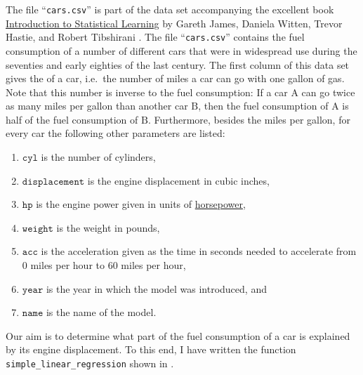 The file ``\texttt{cars.csv}'' is part of the data set accompanying the excellent book 
\href{http://www-bcf.usc.edu/~gareth/ISL/index.html}{Introduction to Statistical Learning} by Gareth James,
Daniela Witten, Trevor Hastie, and Robert Tibshirani \cite{james:2014}.  The file 
``\texttt{cars.csv}''  contains the fuel consumption of a number of different cars that were in widespread use during
the seventies and early eighties of the last century.  The first column of this data set gives the 
of a car, i.e.~the number of miles a car can go with one gallon of gas.  Note that
this number is inverse to the fuel consumption:  If a car $\mathrm{A}$ can go twice as many miles per gallon
than another car $\mathrm{B}$, then the fuel consumption of $\mathrm{A}$ is half of the fuel consumption of
$\mathrm{B}$. Furthermore, besides the miles per gallon, for every car the following other parameters are listed:
\begin{enumerate}
\item $\mathtt{cyl}$ is the number of cylinders,
\item $\mathtt{displacement}$ is the engine displacement in cubic inches, 
\item $\mathtt{hp}$ is the engine power given in units of \href{https://en.wikipedia.org/wiki/Horsepower}{horsepower},
\item $\mathtt{weight}$ is the weight in pounds,
\item $\mathtt{acc}$ is the acceleration given as the time in seconds needed to accelerate from 0 miles per
      hour to 60 miles per hour,
\item $\mathtt{year}$ is the year in which the model was introduced, and
\item $\mathtt{name}$ is the name of the model.
\end{enumerate}
Our aim is to determine what part of the fuel consumption of a car is explained by its engine displacement.
To this end, I have written the function \texttt{simple\_linear\_regression} shown in .


